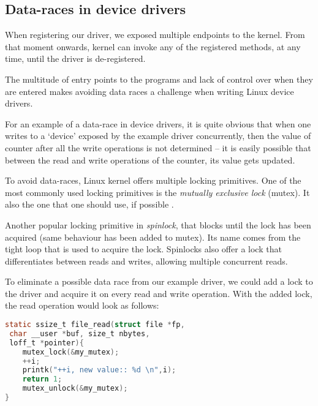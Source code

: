 \documentclass[..thesis.tex]{subfiles}
\begin{document}
\subsection{Data-races in device drivers}


When registering our driver, we exposed multiple endpoints to the kernel. From that moment onwards, kernel can invoke any of the registered methods, at any time, until the driver is de-registered. 


The multitude of entry points to the programs and lack of control over when they are entered makes avoiding data races a challenge when writing Linux device drivers. 

For an example of a data-race in device drivers, it is quite obvious that when one writes to a `device' exposed by the example driver concurrently, then the value of counter after all the write operations is not determined -- it is easily possible that between the read and write operations of the counter, its value gets updated.




To avoid data-races, Linux kernel offers multiple locking primitives. One of the most commonly used locking primitives is the \textit{mutually exclusive lock} (mutex). It also the one that one should use, if possible \cite[Documentation/locking/mutex-design.txt]{torvalds_linux}.

Another popular locking primitive in \textit{spinlock}, that blocks until the lock has been acquired (same behaviour has been added to mutex). Its name comes from the tight loop that is used to acquire the lock. Spinlocks also offer a lock that differentiates between reads and writes, allowing multiple concurrent reads.

To eliminate a possible data race from our example driver, we could add a lock to the driver and acquire it on every read and write operation. With the added lock, the read operation would look as follows:

\begin{lstlisting}[language=C,style=def]
static ssize_t file_read(struct file *fp,
 char __user *buf, size_t nbytes, 
 loff_t *pointer){
    mutex_lock(&my_mutex);
    ++i;
    printk("++i, new value:: %d \n",i);
    return 1;
    mutex_unlock(&my_mutex);
}
\end{lstlisting}
\end{document}
